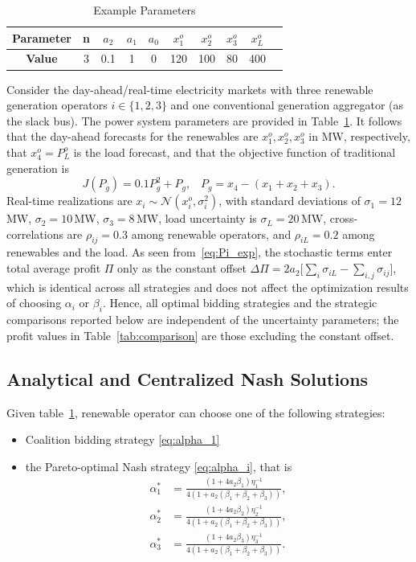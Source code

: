 \documentclass[conference]{IEEEtran}
\begin{document}
\begin{table}[hbt!]
\centering
\caption{Example Parameters}
\label{tab:example_params}
\begin{tabular}{|c||c||c|c|c||c|c|c||c|c|}
\hline
\textbf{Parameter} & n & $a_2$ & $a_1$ & $a_0$ & $x_1^o$ & $x_2^o$ & $x_3^o$ & $x_L^o$ \\ \hline
\textbf{Value} &  $3$ &  0.1 & 1 & 0 & 120 & 100 & 80 & 400 \\
\hline
\end{tabular}
\end{table}

Consider the day-ahead/real-time electricity markets with three renewable generation operators $i \in \{1,2,3\}$ and one conventional generation aggregator (as the slack bus). The power system parameters are provided in Table~\ref{tab:example_params}. It follows that the day-ahead forecasts for the renewables are $x_1^o, x_2^o, x_3^o$ in MW, respectively, that $x_4^o = P_L^o$ is the load forecast, and that the objective function of traditional generation is 
\[
J(P_g) = 0.1P_g^2 + P_g, \;\;\; P_g=x_4-(x_1+x_2+x_3). 
\]
Real-time realizations are $x_i \sim \mathcal{N}(x_i^o,\sigma_i^2)$, with standard deviations of $\sigma_1 = 12$\,MW, $\sigma_2 = 10$\,MW, $\sigma_3 = 8$\,MW, load uncertainty is $\sigma_L = 20$\,MW, cross-correlations are $\rho_{ij}=0.3$ among renewable operators, and $\rho_{iL}=0.2$ among renewables and the load. As seen from~\eqref{eq:Pi_exp}, the stochastic terms enter total average profit $\Pi$ only as the constant offset $\Delta\Pi = 2a_2\bigl[\sum_i\sigma_{iL} - \sum_{i,j}\sigma_{ij}\bigr]$, which is identical across all strategies and does not affect the optimization results of choosing $\alpha_i$ or $\beta_i$. Hence, all optimal bidding strategies and the strategic comparisons reported below are independent of the uncertainty parameters; the profit values in Table~\ref{tab:comparison} are those excluding the constant offset.

\subsection{Analytical and Centralized Nash Solutions}

Given table~\ref{tab:example_params}, renewable operator can choose one of the following strategies:
\begin{itemize}
    \item Coalition bidding strategy \eqref{eq:alpha_1} 
    \item the Pareto-optimal Nash strategy \eqref{eq:alpha_i}, that is
\begin{subequations}
\begin{align}
\alpha_1^*
&=
\frac{(1+4a_2\beta_1)\eta_1^{-1}}
{4\left(1+a_2(\beta_1+\beta_2+\beta_3)\right)},
\\[6pt]
\alpha_2^*
&=
\frac{(1+4a_2\beta_2)\eta_2^{-1}}
{4\left(1+a_2(\beta_1+\beta_2+\beta_3)\right)},
\\[6pt]
\alpha_3^*
&=
\frac{(1+4a_2\beta_3)\eta_3^{-1}}
{4\left(1+a_2(\beta_1+\beta_2+\beta_3)\right)}.
\end{align}
\label{eq:3p}
\end{subequations}
\end{itemize}
\end{document}
